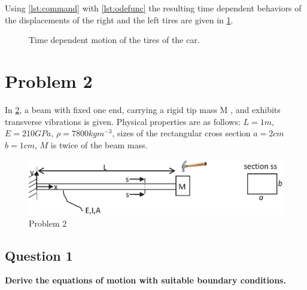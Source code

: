 \documentclass[]{report}
\begin{document}
\newpage
\lstset{frame=single,numbers=left}

Using \cref{lst:command} with \cref{lst:odefunc} the resulting time dependent behaviors of the displacements of the right and the left tires are given in \cref{fig:timedependenttires}.
\begin{figure}[ht!]
\centering

\caption{Time dependent motion of the tires of the car.}
\label{fig:timedependenttires}
\end{figure}

\section*{Problem 2}
In \cref{fig:problem2}, a beam  with fixed one end, carrying  a rigid tip mass M , and exhibits transverse vibrations is given. Physical properties are as follows:  $L =1m$, $E=210GPa$, $\rho=7800kgm^{-3}$, sizes of the rectangular cross section $a=2cm$ $b=1cm$, $M$ is twice of the beam mass.
\begin{figure}[ht!]
\centering
\includegraphics[width=\textwidth]{./Figures/2st_Assignment_2}
\caption{Problem 2}
\label{fig:problem2}
\end{figure}
\subsection*{Question 1}
\textbf{Derive the equations of motion with suitable boundary conditions.}
\\~\\





\end{document}
